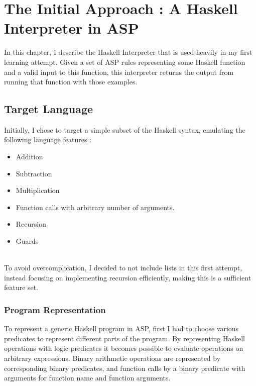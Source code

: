 \chapter{The Initial Approach : A Haskell Interpreter in ASP}

In this chapter, I describe the Haskell Interpreter that is used heavily in my first learning attempt. Given a set of ASP rules representing some Haskell function and a valid input to this function, this interpreter returns the output from running that function with those examples.

\section{Target Language}

Initially, I chose to target a simple subset of the Haskell syntax, emulating the following language features :

\begin{itemize}
\item Addition
\item Subtraction
\item Multiplication
\item Function calls with arbitrary number of arguments.
\item Recursion
\item Guards
\end{itemize}
\mbox{}\\
To avoid overcomplication, I decided to not include lists in this first attempt, instead focusing on implementing recursion efficiently, making this is a sufficient feature set. 

\subsection{Program Representation}
To represent a generic Haskell program in ASP, first I had to choose various predicates to represent different parts of the program. By representing Haskell operations with logic predicates it becomes possible to evaluate operations on arbitrary expressions. Binary arithmetic operations are represented by corresponding binary predicates, and function calls by a binary predicate with arguments for function name and function arguments.  \\ \\

